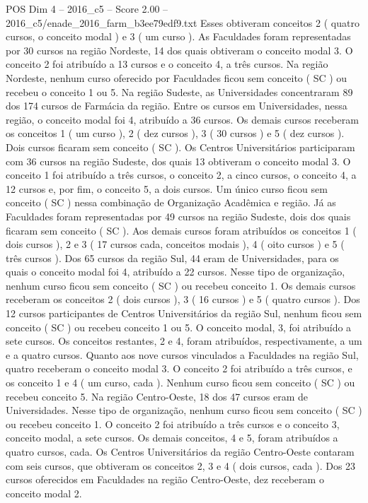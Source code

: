 \begin{textsample}{POS Dim 4 – 2016\_c5 – Score 2.00 – 2016\_c5/enade\_2016\_farm\_b3ee79edf9.txt}
Esses obtiveram conceitos 2 ( quatro cursos, o conceito modal ) e 3 ( um curso ).
As Faculdades foram representadas por 30 cursos na região Nordeste, 14 dos quais obtiveram o conceito modal 3.
O conceito 2 foi atribuído a 13 cursos e o conceito 4, a três cursos.
Na região Nordeste, nenhum curso oferecido por Faculdades ficou sem conceito ( SC ) ou recebeu o conceito 1 ou 5.
Na região Sudeste, as Universidades concentraram 89 dos 174 cursos de Farmácia da região.
Entre os cursos em Universidades, nessa região, o conceito modal foi 4, atribuído a 36 cursos.
Os demais cursos receberam os conceitos 1 ( um curso ), 2 ( dez cursos ), 3 ( 30 cursos ) e 5 ( dez cursos ).
Dois cursos ficaram sem conceito ( SC ).
Os Centros Universitários participaram com 36 cursos na região Sudeste, dos quais 13 obtiveram o conceito modal 3.
O conceito 1 foi atribuído a três cursos, o conceito 2, a cinco cursos, o conceito 4, a 12 cursos e, por fim, o conceito 5, a dois cursos.
Um único curso ficou sem conceito ( SC ) nessa combinação de Organização Acadêmica e região.
Já as Faculdades foram representadas por 49 cursos na região Sudeste, dois dos quais ficaram sem conceito ( SC ).
Aos demais cursos foram atribuídos os conceitos 1 ( dois cursos ), 2 e 3 ( 17 cursos cada, conceitos modais ), 4 ( oito cursos ) e 5 ( três cursos ).
Dos 65 cursos da região Sul, 44 eram de Universidades, para os quais o conceito modal foi 4, atribuído a 22 cursos.
Nesse tipo de organização, nenhum curso ficou sem conceito ( SC ) ou recebeu conceito 1.
Os demais cursos receberam os conceitos 2 ( dois cursos ), 3 ( 16 cursos ) e 5 ( quatro cursos ).
Dos 12 cursos participantes de Centros Universitários da região Sul, nenhum ficou sem conceito ( SC ) ou recebeu conceito 1 ou 5.
O conceito modal, 3, foi atribuído a sete cursos.
Os conceitos restantes, 2 e 4, foram atribuídos, respectivamente, a um e a quatro cursos.
Quanto aos nove cursos vinculados a Faculdades na região Sul, quatro receberam o conceito modal 3.
O conceito 2 foi atribuído a três cursos, e os conceito 1 e 4 ( um curso, cada ).
Nenhum curso ficou sem conceito ( SC ) ou recebeu conceito 5.
Na região Centro-Oeste, 18 dos 47 cursos eram de Universidades.
Nesse tipo de organização, nenhum curso ficou sem conceito ( SC ) ou recebeu conceito 1.
O conceito 2 foi atribuído a três cursos e o conceito 3, conceito modal, a sete cursos.
Os demais conceitos, 4 e 5, foram atribuídos a quatro cursos, cada.
Os Centros Universitários da região Centro-Oeste contaram com seis cursos, que obtiveram os conceitos 2, 3 e 4 ( dois cursos, cada ).
Dos 23 cursos oferecidos em Faculdades na região Centro-Oeste, dez receberam o conceito modal 2.

\end{textsample}
